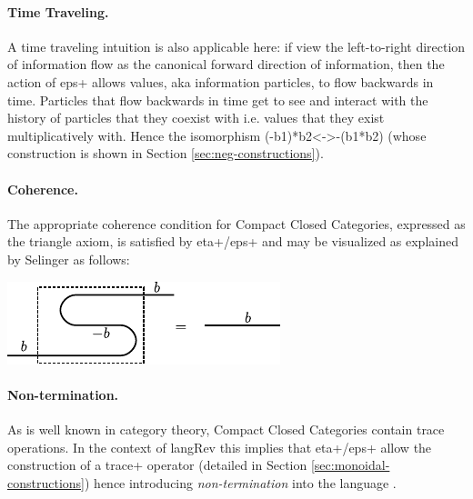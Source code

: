 \documentclass[preprint]{sigplanconf}
\begin{document}
\begin{multicols}{2}
\begin{center}
\end{center}
  
\begin{center}
\end{center}  
\end{multicols}

\paragraph*{Time Traveling.}
A time traveling intuition is also applicable here: if view the
left-to-right direction of information flow as the canonical forward
direction of information, then the action of {{eps+}} allows values,
aka information particles, to flow backwards in time. Particles that
flow backwards in time get to see and interact with the history of
particles that they coexist with i.e. values that they exist
multiplicatively with. Hence the isomorphism {{(-b1)*b2<->-(b1*b2)}}
(whose construction is shown in Section \ref{sec:neg-constructions}).

\paragraph*{Coherence.}
The appropriate coherence condition for Compact Closed Categories,
expressed as the triangle axiom, is satisfied by {{eta+}}/{{eps+}} and
may be visualized as explained by Selinger
\cite{springerlink:10.1007/978-3-642-12821-94} as follows:

\begin{center}
  \includegraphics{diagrams/coherence.pdf}
\end{center}

\paragraph*{Non-termination.}
As is well known in category theory, Compact Closed Categories contain
trace operations.  In the context of {{langRev}} this implies that
{{eta+}}/{{eps+}} allow the construction of a {{trace+}} operator
(detailed in Section \ref{sec:monoidal-constructions}) hence
introducing \emph{non-termination} into the language
\cite{infeffects}.
\end{document}
